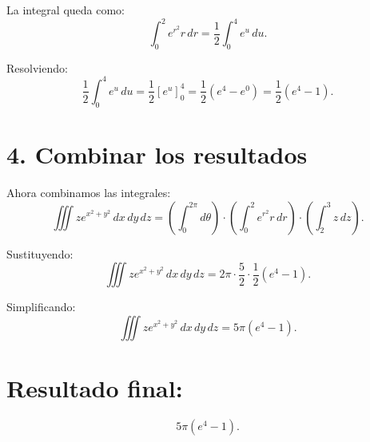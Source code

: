 \documentclass{article}
\begin{document}
La integral queda como:
\[
\int_{0}^{2} e^{r^2} r \, dr = \frac{1}{2} \int_{0}^{4} e^u \, du.
\]

Resolviendo:
\[
\frac{1}{2} \int_{0}^{4} e^u \, du = \frac{1}{2} \left[e^u\right]_{0}^{4} = \frac{1}{2} \left(e^4 - e^0\right) = \frac{1}{2} (e^4 - 1).
\]

\section*{4. Combinar los resultados}

Ahora combinamos las integrales:
\[
\iiint ze^{x^2 + y^2} \, dx \, dy \, dz = \left(\int_{0}^{2\pi} d\theta\right) \cdot \left(\int_{0}^{2} e^{r^2} r \, dr\right) \cdot \left(\int_{2}^{3} z \, dz\right).
\]

Sustituyendo:
\[
\iiint ze^{x^2 + y^2} \, dx \, dy \, dz = 2\pi \cdot \frac{5}{2} \cdot \frac{1}{2} (e^4 - 1).
\]

Simplificando:
\[
\iiint ze^{x^2 + y^2} \, dx \, dy \, dz = 5\pi (e^4 - 1).
\]

\section*{Resultado final:}
\[
\boxed{5\pi (e^4 - 1)}.
\]
\end{document}
